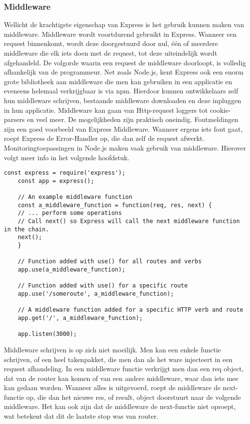 \subsubsection{Middleware}
\label{sec:expressMiddleware}

Wellicht de krachtigste eigenschap van Express is het gebruik kunnen maken van middleware. Middleware wordt voortdurend gebruikt in Express. Wanneer een request binnenkomt, wordt deze doorgestuurd door nul, één of meerdere middleware die elk iets doen met de request, tot deze uiteindelijk wordt afgehandeld. De volgorde waarin een request de middleware doorloopt, is volledig afhankelijk van de programmeur. Net zoals Node.js, kent Express ook een enorm grote bibliotheek aan middleware die men kan gebruiken in een applicatie en eveneens helemaal verkrijgbaar is via npm. Hierdoor kunnen ontwikkelaars zelf hun middleware schrijven, bestaande middleware downloaden en deze inpluggen in hun applicatie. Middleware kan gaan van Http-request loggers tot cookie-parsers en veel meer. De mogelijkheden zijn praktisch oneindig. Foutmeldingen zijn een goed voorbeeld van Express Middleware. Wanneer ergens iets fout gaat, roept Express de Error-Handler op, die dan zelf de request afwerkt. Monitoringtoepassingen in Node.js maken vaak gebruik van middleware. Hierover volgt meer info in het volgende hoofdstuk.

\begin{minipage}{\linewidth}
	\begin{lstlisting}[style=ES6,
						caption={Express code flow voorbeeld.},
						label=code:expressexample]
	const express = require('express');
	const app = express();
	
	// An example middleware function
	const a_middleware_function = function(req, res, next) {
	// ... perform some operations
	// Call next() so Express will call the next middleware function in the chain.
	next();
	}
	
	// Function added with use() for all routes and verbs
	app.use(a_middleware_function);
	
	// Function added with use() for a specific route
	app.use('/someroute', a_middleware_function);
	
	// A middleware function added for a specific HTTP verb and route
	app.get('/', a_middleware_function);
	
	app.listen(3000);
	\end{lstlisting}
\end{minipage}	
	
Middleware schrijven is op zich niet moeilijk. Men kan een enkele functie schrijven, of een heel takenpakket, die men dan als het ware injecteert in een request afhandeling. In een middleware functie verkrijgt men dan een req object, dat van de router kan komen of van een andere middleware, waar dan iets mee kan gedaan worden. Wanneer alles is uitgevoerd, roept de middleware de next-functie op, die dan het nieuwe res, of result, object doorstuurt naar de volgende middleware. Het kan ook zijn dat de middleware de next-functie niet oproept, wat betekent dat dit de laatste stop was van router. 

